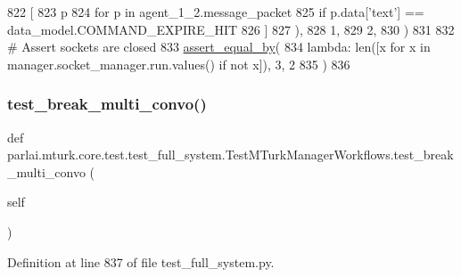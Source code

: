 \begin{DoxyCode}
822                 [
823                     p
824                     \textcolor{keywordflow}{for} p \textcolor{keywordflow}{in} agent\_1\_2.message\_packet
825                     \textcolor{keywordflow}{if} p.data[\textcolor{stringliteral}{'text'}] == data\_model.COMMAND\_EXPIRE\_HIT
826                 ]
827             ),
828             1,
829             2,
830         )
831 
832         \textcolor{comment}{# Assert sockets are closed}
833         \hyperlink{namespaceparlai_1_1mturk_1_1core_1_1test_1_1test__full__system_a0b463246d35658a2e422010f13dcf819}{assert\_equal\_by}(
834             \textcolor{keyword}{lambda}: len([x \textcolor{keywordflow}{for} x \textcolor{keywordflow}{in} manager.socket\_manager.run.values() \textcolor{keywordflow}{if} \textcolor{keywordflow}{not} x]), 3, 2
835         )
836 
\end{DoxyCode}
\mbox{\label{classparlai_1_1mturk_1_1core_1_1test_1_1test__full__system_1_1TestMTurkManagerWorkflows_add66c07d44176ab04d777af94f8f046a}} 
\subsubsection{\texorpdfstring{test\+\_\+break\+\_\+multi\+\_\+convo()}{test\_break\_multi\_convo()}}
{\footnotesize\ttfamily def parlai.\+mturk.\+core.\+test.\+test\+\_\+full\+\_\+system.\+Test\+M\+Turk\+Manager\+Workflows.\+test\+\_\+break\+\_\+multi\+\_\+convo (\begin{DoxyParamCaption}\item[{}]{self }\end{DoxyParamCaption})}



Definition at line 837 of file test\+\_\+full\+\_\+system.\+py.


